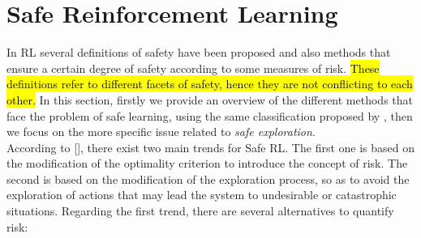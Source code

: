 \section{Safe Reinforcement Learning}\label{sec:saferl}
In \ac{RL} several definitions of safety have been proposed and also methods that ensure a certain degree of safety according to some measures of risk. \hl{These definitions refer to different facets of safety, hence they are not conflicting to each other.} In this section, firstly we provide an overview of the different methods that face the problem of safe learning, using the same classification proposed by \citeauthor{JMLR:v16:garcia15a}, then we focus on the more specific issue related to \emph{safe exploration}.\\
\newline
According to [\cite{JMLR:v16:garcia15a}], there exist two main trends for Safe \ac{RL}. The first one is based on the modification of the optimality criterion to introduce the concept of risk. The second is based on the modification of the exploration process, so as to avoid the exploration of actions that may lead the system to undesirable or catastrophic situations. Regarding the first trend, there are several alternatives to quantify risk:
